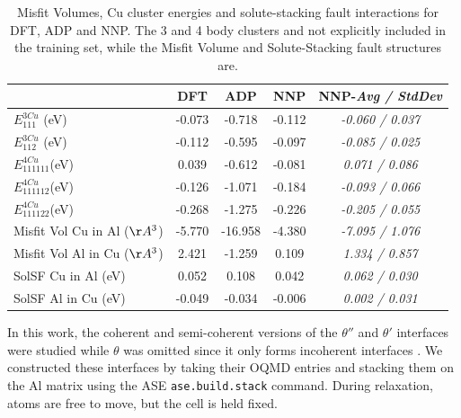\documentclass{article}
\begin{document}
\begin{table}[h!]
\begin{tabular}{l|cccc}%
\hline%
&DFT&ADP&NNP& NNP-\emph{Avg / StdDev}\\%
\hline%
$E^{3Cu}_{111}$ (eV)&-0.073&{-}0.718&{-}0.112&\emph{-0.060 / 0.037}\\%
$E^{3Cu}_{112}$ (eV)&-0.112&{-}0.595&{-}0.097&\emph{-0.085 / 0.025}\\%
$E^{4Cu}_{111111}$(eV)&0.039&{-}0.612&{-}0.081&\emph{0.071 / 0.086}\\%
$E^{4Cu}_{111112}$(eV)&-0.126&{-}1.071&{-}0.184&\emph{-0.093 / 0.066}\\%
$E^{4Cu}_{111122}$(eV)&-0.268&{-}1.275&{-}0.226&\emph{-0.205 / 0.055}\\%
Misfit Vol Cu in Al ($\AA^3$)&{-}5.770&{-}16.958&{-}4.380&\emph{-7.095 / 1.076}\\%
Misfit Vol Al in Cu ($\AA^3$)&2.421&{-}1.259&0.109&\emph{1.334 / 0.857}\\%
SolSF Cu in Al (eV)&0.052&0.108&0.042&\emph{0.062 / 0.030}\\%
SolSF Al in Cu (eV)&{-}0.049&{-}0.034&{-}0.006&\emph{0.002 / 0.031}\\%
\end{tabular}%
\caption{Misfit Volumes, Cu cluster energies and solute-stacking fault interactions for DFT, ADP and NNP. 
The 3 and 4 body clusters and not explicitly included in the training set, while the Misfit Volume and 
Solute-Stacking fault structures are.}
\label{table:solute_special}
\end{table}

In this work, the coherent and semi-coherent versions of the $\theta''$ and $\theta'$ interfaces were studied while $\theta$ was omitted since it only forms incoherent interfaces \cite{Nie2014PhysicalAlloys}.
We constructed these interfaces by taking their OQMD entries and stacking them on the Al matrix using the ASE \texttt{ase.build.stack} command.
During relaxation, atoms are free to move, but the cell is held fixed. 
\end{document}
